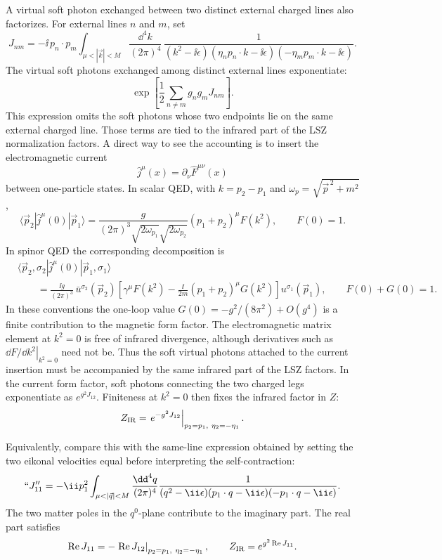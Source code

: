 A virtual soft photon exchanged between two distinct external charged lines
also factorizes.  For external lines \(n\) and \(m\), set
\[
  J_{nm}
  =
  -\ii\,p_n\cdot p_m
  \int_{\mu<|\vec k|<M}
  \frac{\dd^4k}{(2\pi)^4}\,
  \frac{1}
       {(k^2-\ii\epsilon)
        (\eta_n p_n\cdot k-\ii\epsilon)
        (-\eta_m p_m\cdot k-\ii\epsilon)} .
\]
The virtual soft photons exchanged among distinct external lines exponentiate:
\[
  \exp\!\left[
    \frac12\sum_{n\ne m}g_ng_mJ_{nm}
  \right].
\]
This expression omits the soft photons whose two endpoints lie on the same
external charged line.  Those terms are tied to the infrared part of the LSZ
normalization factors.  A direct way to see the accounting is to insert the
electromagnetic current
\[
  \widehat j^\mu(x)=\partial_\nu \widehat F^{\mu\nu}(x)
\]
between one-particle states.  In scalar QED, with
\(k=p_2-p_1\) and
\(\omega_p=\sqrt{\vec p^{\,2}+m^2}\),
\[
  \langle \vec p_2|\widehat j^\mu(0)|\vec p_1\rangle
  =
  \frac{g}{(2\pi)^3\sqrt{2\omega_{p_1}}\sqrt{2\omega_{p_2}}}
  (p_1+p_2)^\mu F(k^2),
  \qquad F(0)=1 .
\]
In spinor QED the corresponding decomposition is
\[
\begin{aligned}
  &\langle \vec p_2,\sigma_2|\widehat j^\mu(0)
  |\vec p_1,\sigma_1\rangle
\\
  &\qquad =
  \frac{\ii g}{(2\pi)^3}\,
  \bar u^{\sigma_2}(\vec p_2)
  \left[
    \gamma^\mu F(k^2)
    -\frac{\ii}{2m}(p_1+p_2)^\mu G(k^2)
  \right]
  u^{\sigma_1}(\vec p_1),
  \qquad F(0)+G(0)=1 .
\end{aligned}
\]
In these conventions the one-loop value \(G(0)=-g^2/(8\pi^2)+O(g^4)\) is a
finite contribution to the magnetic form factor.  The electromagnetic matrix
element at \(k^2=0\) is free of infrared divergence, although derivatives such
as \(\left.\dd F/\dd k^2\right|_{k^2=0}\) need not be.  Thus the soft virtual
photons attached to the current insertion must be accompanied by the same
infrared part of the LSZ factors.
In the current form factor, soft photons connecting
the two charged legs exponentiate as \(e^{g^2J_{12}}\).  Finiteness at
\(k^2=0\) then fixes the infrared factor in \(Z\):
\[
  Z_{\rm IR}
  =
  \left.
  e^{-g^2J_{12}}
  \right|_{p_2=p_1,\ \eta_2=-\eta_1}.
\]

Equivalently, compare this with the same-line expression obtained by setting
the two eikonal velocities equal before interpreting the self-contraction:
\[
  ``J_{11}''
  =
  -\ii p_1^2
  \int_{\mu<|\vec q|<M}
  \frac{\dd^4q}{(2\pi)^4}
  \frac{1}
       {(q^2-\ii\epsilon)
        (p_1\cdot q-\ii\epsilon)
        (-p_1\cdot q-\ii\epsilon)} .
\]
The two matter poles in the \(q^0\)-plane contribute to the imaginary part.
The real part satisfies
\[
  \operatorname{Re}J_{11}
  =
  -\left.
  \operatorname{Re}J_{12}
  \right|_{p_2=p_1,\ \eta_2=-\eta_1},
  \qquad
  Z_{\rm IR}=e^{g^2\operatorname{Re}J_{11}} .
\]

